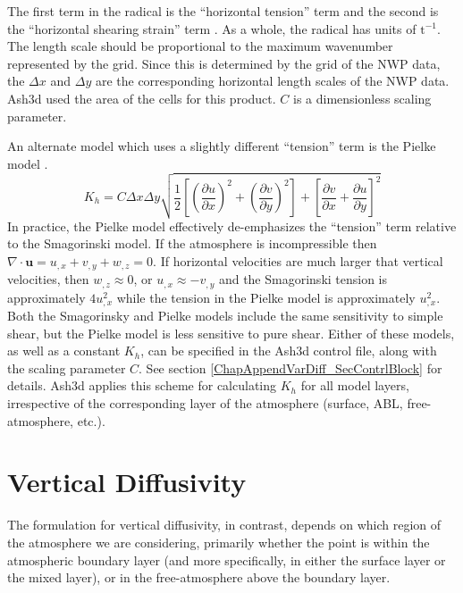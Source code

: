 The first term in the radical is the ``horizontal tension'' term and the second is
the ``horizontal shearing strain'' term \cite{Griffies2000}.
As a whole, the radical has units of $\mathrm{t}^{-1}$.
The length scale should be proportional to the maximum wavenumber represented by the grid.
Since this is determined by the grid of the NWP data, the $\Delta x$ and $\Delta y$ are the 
corresponding horizontal length scales of the NWP data. Ash3d used the area of the cells
for this product. $C$ is a dimensionless scaling parameter.

An alternate model which uses a slightly different ``tension'' term is the Pielke model \cite{Pielke1974}.
\begin{equation}\label{VarDiff_Eq_Pielke}
K_h = C \Delta x \Delta y \sqrt{
\frac{1}{2}\left[ \left(\frac{\partial u}{\partial x}\right)^2 + \left(\frac{\partial v}{\partial y}\right)^2 \right]
+ \left[ \frac{\partial v}{\partial x} +\frac{\partial u}{\partial y} \right]^2}
\end{equation}
In practice, the Pielke model effectively de-emphasizes the ``tension'' term relative to
the Smagorinski model. If the atmosphere is incompressible then $\nabla \cdot \mathbf{u}=u_{,x}+v_{,y}+w_{,z}=0$.
If horizontal velocities are much larger that vertical velocities, then 
$w_{,z}\approx 0$, or $u_{,x} \approx - v_{,y}$ and the Smagorinski tension is
approximately $4 u_{,x}^2$ while the tension in the Pielke model is approximately $u_{,x}^2$.
Both the Smagorinsky and Pielke models include the same sensitivity to simple shear, but
the Pielke model is less sensitive to pure shear. Either of these models, as well as
a constant $K_h$, can be specified in the Ash3d control file, along with the scaling
parameter $C$. See section \ref{ChapAppendVarDiff_SecContrlBlock} for details. Ash3d
applies this scheme for calculating $K_h$ for all model layers, irrespective of the
corresponding layer of the atmosphere (surface, ABL, free-atmosphere, etc.).

\section{Vertical Diffusivity}\label{ChapAppendVarDiff_Sec_Kv}
The formulation for vertical diffusivity, in contrast, depends on which region of the atmosphere
we are considering, primarily whether the point is within the atmospheric boundary
layer (and more specifically, in either the surface layer or the mixed layer),
or in the free-atmosphere above the boundary layer.


